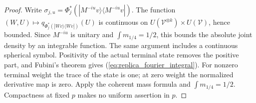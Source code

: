 \begin{proof}\leanok
    Write $\sigma_{j,u}=\Phi_j^*(|M^{-iu}v\rangle\langle M^{-iu}v|)$. The function
    $(W,U)\mapsto q_{\Phi_j^*(|Wv\rangle\langle Wv|)}(U)$ is continuous on
    $U(\mathcal V^{\otimes k})\times U(\mathcal V)$, hence bounded. Since
    $M^{-iu}$ is unitary and $\int m_{1/4}=1/2$, this bounds the absolute joint
    density by an integrable function. The same argument includes a continuous
    spherical symbol. Positivity of the actual terminal state removes the positive
    part, and Fubini's theorem gives (\ref{eq:replica_fourier_integral}). For
    nonzero terminal weight the trace of the state is one; at zero weight the
    normalized derivative map is zero. Apply the coherent mass formula and
    $\int m_{1/4}=1/2$. Compactness at fixed $p$ makes no uniform assertion in $p$.
\end{proof}
